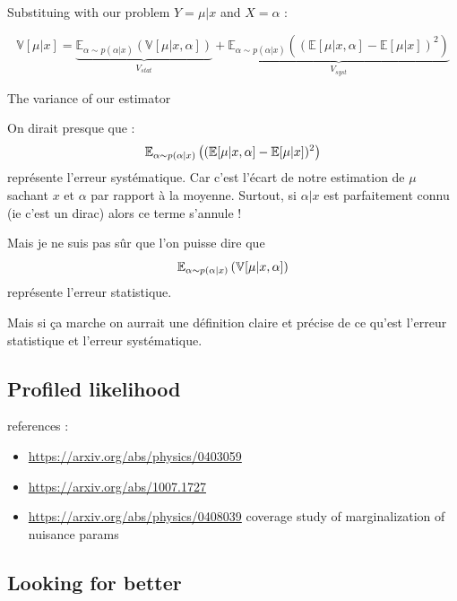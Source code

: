 Substituing with our problem  $Y = \mu|x$ and $X = \alpha$ :

$$
\mathbb{V}[\mu|x] = \underbrace{\mathbb{E}_{\alpha \sim p(\alpha|x)} \left (\mathbb{V}[\mu|x, \alpha] \right )}_{V_{stat}} + \underbrace{\mathbb{E}_{\alpha \sim p(\alpha|x)} \left ( (\mathbb{E} [\mu|x, \alpha]  - \mathbb{E}[\mu|x])^2\right )}_{V_{syst}}
$$

The variance of our estimator

On dirait presque que : 
$$\mathbb{E}_{\alpha \sim p(\alpha|x)} \left ((\mathbb{E} [\mu|x, \alpha]  - \mathbb{E}[\mu|x])^2\right )$$
représente l'erreur systématique. 
Car c'est l'écart de notre estimation de $\mu$ sachant $x$ et $\alpha$ par rapport à la moyenne.
Surtout, si $\alpha|x$ est parfaitement connu (ie c'est un dirac) alors ce terme s'annule !

Mais je ne suis pas sûr que l'on puisse dire que
$$\mathbb{E}_{\alpha \sim p(\alpha|x)} \left (\mathbb{V}[\mu|x, \alpha] \right )$$
représente l'erreur statistique.

Mais si ça marche on aurrait une définition claire et précise de ce qu'est l'erreur statistique et l'erreur systématique.






\subsection{Profiled likelihood} %
\label{sub:profiled_likelihood}




references : 
\begin{itemize}
	\item \url{https://arxiv.org/abs/physics/0403059}
	\item \url{https://arxiv.org/abs/1007.1727}
	\item \url{https://arxiv.org/abs/physics/0408039} coverage study of marginalization of nuisance params
\end{itemize}




\subsection{Looking for better} %
\label{sub:looking_for_better}




